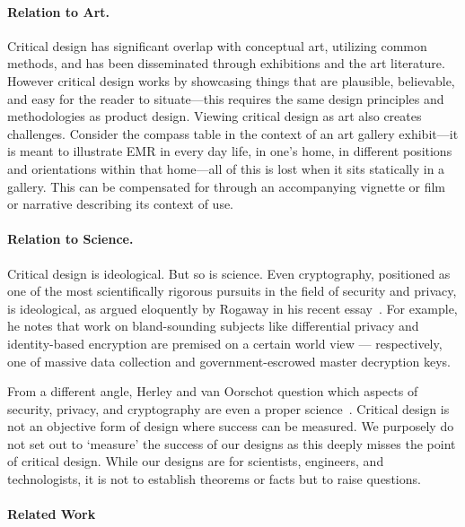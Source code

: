 \paragraph{Relation to Art.} 

Critical design has significant overlap with conceptual art, utilizing common methods, and has been disseminated through exhibitions and the art literature. However critical design works by showcasing things that are plausible, believable, and easy for the reader to situate---this requires the same design principles and methodologies as product design. Viewing critical design as art also creates challenges. Consider the compass table in the context of an art gallery exhibit---it is meant to illustrate EMR in every day life, in one's home, in different positions and orientations within that home---all of this is lost when it sits statically in a gallery. This can be compensated for through an accompanying vignette or film or narrative describing its context of use.

\paragraph{Relation to Science.} 

Critical design is ideological. But so is science. Even cryptography, positioned as one of the most scientifically rigorous pursuits in the field of security and privacy, is ideological, as argued eloquently by Rogaway in his recent essay~\cite{Rog15}. For example, he notes that work on bland-sounding subjects like differential privacy and identity-based encryption are premised on a certain world view --- respectively, one of massive data collection and government-escrowed master decryption keys. 

From a different angle, Herley and van Oorschot question which aspects of security, privacy, and cryptography are even a proper science~\cite{HvO17}. Critical design is not an objective form of design where success can be measured. We purposely do not set out to `measure' the success of our designs as this deeply misses the point of critical design. While our designs are for scientists, engineers, and technologists, it is not to establish theorems or facts but to raise questions. 

\paragraph{Related Work}


